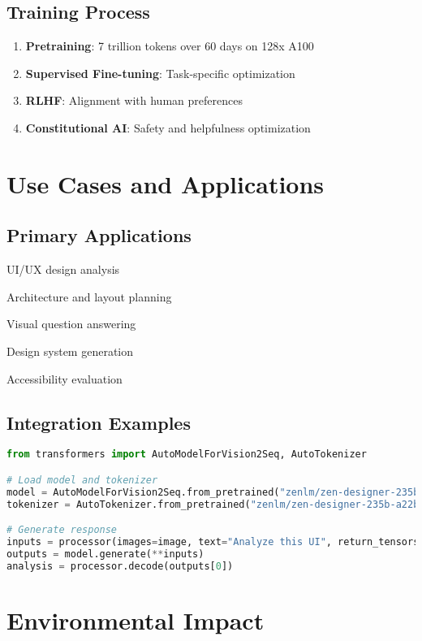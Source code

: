 \documentclass[11pt,a4paper]{article}
\begin{document}
\subsection{Training Process}
\begin{enumerate}
    \item \textbf{Pretraining}: 7 trillion tokens over 60 days on 128x A100
    \item \textbf{Supervised Fine-tuning}: Task-specific optimization
    \item \textbf{RLHF}: Alignment with human preferences
    \item \textbf{Constitutional AI}: Safety and helpfulness optimization
\end{enumerate}

\section{Use Cases and Applications}

\subsection{Primary Applications}
\item UI/UX design analysis
\item Architecture and layout planning
\item Visual question answering
\item Design system generation
\item Accessibility evaluation

\subsection{Integration Examples}

\begin{lstlisting}[language=Python, caption=Basic Usage Example]
from transformers import AutoModelForVision2Seq, AutoTokenizer

# Load model and tokenizer
model = AutoModelForVision2Seq.from_pretrained("zenlm/zen-designer-235b-a22b-instruct")
tokenizer = AutoTokenizer.from_pretrained("zenlm/zen-designer-235b-a22b-instruct")

# Generate response
inputs = processor(images=image, text="Analyze this UI", return_tensors="pt")
outputs = model.generate(**inputs)
analysis = processor.decode(outputs[0])
\end{lstlisting}

\section{Environmental Impact}
\end{document}
